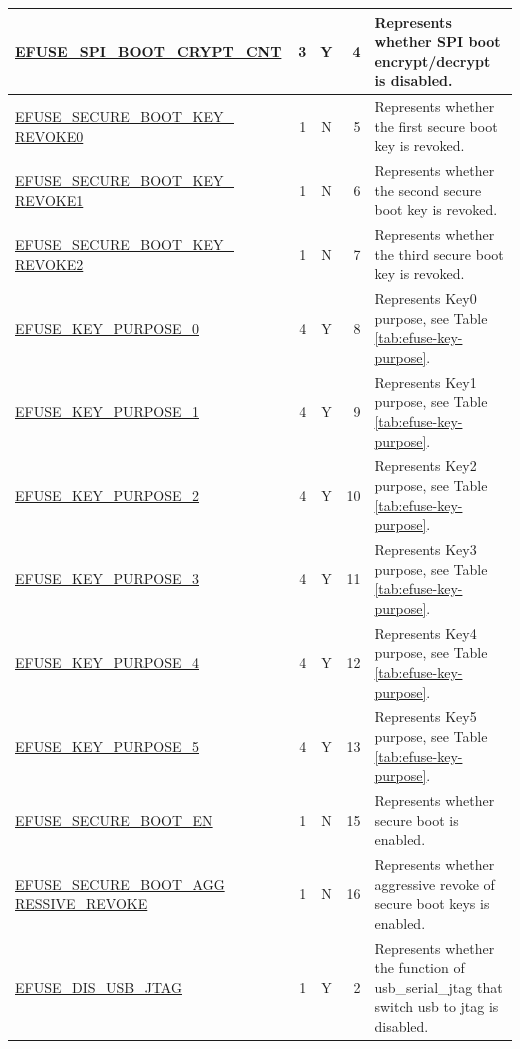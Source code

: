 \begin{longtable}[l]{ |m{8.2cm}|r|c|r|m{9cm}| }
    \hyperref[fielddesc:EFUSESPIBOOTCRYPTCNT]{EFUSE\_SPI\_BOOT\_CRYPT\_CNT} & 3 & Y & 4 & Represents whether SPI boot encrypt/decrypt is disabled. \\
    \hline
    \hyperref[fielddesc:EFUSESECUREBOOTKEYREVOKE0]{EFUSE\_SECURE\_BOOT\_KEY\_
    REVOKE0} & 1 & N & 5 & Represents whether the first secure boot key is revoked. \\
    \hline
    \hyperref[fielddesc:EFUSESECUREBOOTKEYREVOKE1]{EFUSE\_SECURE\_BOOT\_KEY\_
    REVOKE1} & 1 & N & 6 & Represents whether the second secure boot key is revoked. \\
    \hline
    \hyperref[fielddesc:EFUSESECUREBOOTKEYREVOKE2]{EFUSE\_SECURE\_BOOT\_KEY\_
    REVOKE2} & 1 & N & 7 & Represents whether the third secure boot key is revoked. \\
    \hline
    \hyperref[fielddesc:EFUSEKEYPURPOSE0]{EFUSE\_KEY\_PURPOSE\_0} & 4 & Y & 8 & Represents Key0 purpose, see Table \ref{tab:efuse-key-purpose}. \\
    \hline
    \hyperref[fielddesc:EFUSEKEYPURPOSE1]{EFUSE\_KEY\_PURPOSE\_1} & 4 & Y & 9 & Represents Key1 purpose, see Table \ref{tab:efuse-key-purpose}.\\
    \hline
    \hyperref[fielddesc:EFUSEKEYPURPOSE2]{EFUSE\_KEY\_PURPOSE\_2} & 4 & Y & 10 & Represents Key2 purpose, see Table  \ref{tab:efuse-key-purpose}. \\ 
    \hline
    \hyperref[fielddesc:EFUSEKEYPURPOSE3]{EFUSE\_KEY\_PURPOSE\_3} & 4 & Y & 11 & Represents Key3 purpose, see Table \ref{tab:efuse-key-purpose}. \\    
    \hline
    \hyperref[fielddesc:EFUSEKEYPURPOSE4]{EFUSE\_KEY\_PURPOSE\_4} & 4 & Y & 12 & Represents Key4 purpose, see Table \ref{tab:efuse-key-purpose}.\\    
    \hline
    \hyperref[fielddesc:EFUSEKEYPURPOSE5]{EFUSE\_KEY\_PURPOSE\_5} & 4 & Y & 13 & Represents Key5 purpose, see Table \ref{tab:efuse-key-purpose}. \\  
    \hline
    \hyperref[fielddesc:EFUSESECUREBOOTEN]{EFUSE\_SECURE\_BOOT\_EN} & 1 & N & 15 & Represents whether secure boot is enabled. \\ 
    \hline
    \hyperref[fielddesc:EFUSESECUREBOOTAGGRESSIVEREVOKE]{EFUSE\_SECURE\_BOOT\_AGG
    RESSIVE\_REVOKE} & 1 & N & 16 & Represents whether aggressive revoke of secure boot keys is enabled. \\
    \hline
    \hyperref[fielddesc:EFUSEDISUSBJTAG]{EFUSE\_DIS\_USB\_JTAG} & 1 & Y & 2 & Represents whether the function of usb\_serial\_jtag that switch usb to jtag is disabled. \\

\end{longtable}
